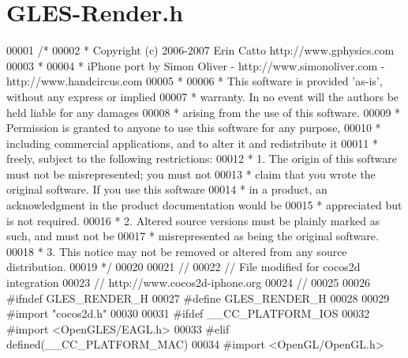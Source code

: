 \hypertarget{_g_l_e_s-_render_8h}{\section{G\-L\-E\-S-\/\-Render.h}
\label{dc/d04/_g_l_e_s-_render_8h}
}

\begin{DoxyCode}
00001 \textcolor{comment}{/*}
00002 \textcolor{comment}{* Copyright (c) 2006-2007 Erin Catto http://www.gphysics.com}
00003 \textcolor{comment}{*}
00004 \textcolor{comment}{* iPhone port by Simon Oliver - http://www.simonoliver.com - http://www.handcircus.com}
00005 \textcolor{comment}{*}
00006 \textcolor{comment}{* This software is provided 'as-is', without any express or implied}
00007 \textcolor{comment}{* warranty.  In no event will the authors be held liable for any damages}
00008 \textcolor{comment}{* arising from the use of this software.}
00009 \textcolor{comment}{* Permission is granted to anyone to use this software for any purpose,}
00010 \textcolor{comment}{* including commercial applications, and to alter it and redistribute it}
00011 \textcolor{comment}{* freely, subject to the following restrictions:}
00012 \textcolor{comment}{* 1. The origin of this software must not be misrepresented; you must not}
00013 \textcolor{comment}{* claim that you wrote the original software. If you use this software}
00014 \textcolor{comment}{* in a product, an acknowledgment in the product documentation would be}
00015 \textcolor{comment}{* appreciated but is not required.}
00016 \textcolor{comment}{* 2. Altered source versions must be plainly marked as such, and must not be}
00017 \textcolor{comment}{* misrepresented as being the original software.}
00018 \textcolor{comment}{* 3. This notice may not be removed or altered from any source distribution.}
00019 \textcolor{comment}{*/}
00020 
00021 \textcolor{comment}{//}
00022 \textcolor{comment}{// File modified for cocos2d integration}
00023 \textcolor{comment}{// http://www.cocos2d-iphone.org}
00024 \textcolor{comment}{//}
00025 
00026 \textcolor{preprocessor}{#ifndef GLES\_RENDER\_H}
00027 \textcolor{preprocessor}{}\textcolor{preprocessor}{#define GLES\_RENDER\_H}
00028 \textcolor{preprocessor}{}
00029 \textcolor{preprocessor}{#import "cocos2d.h"}
00030 
00031 \textcolor{preprocessor}{#ifdef \_\_CC\_PLATFORM\_IOS}
00032 \textcolor{preprocessor}{}\textcolor{preprocessor}{#import <OpenGLES/EAGL.h>}
00033 \textcolor{preprocessor}{#elif defined(\_\_CC\_PLATFORM\_MAC)}
00034 \textcolor{preprocessor}{}\textcolor{preprocessor}{#import <OpenGL/OpenGL.h>}

\end{DoxyCode}
